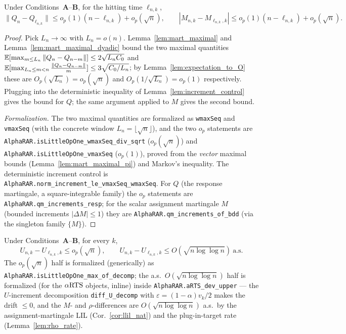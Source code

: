 \begin{lemma}\label{lem:QM_increments}
\leanok
{}
Under Conditions~\textbf{A}--\textbf{B}, for the hitting time $\ell_{n,k}$,
\[
  \|Q_n - Q_{\ell_{n,k}}\| \le o_p(1)(n-\ell_{n,k}) + o_p(\sqrt n),
  \qquad
  |M_{n,k} - M_{\ell_{n,k},k}| \le o_p(1)(n-\ell_{n,k}) + o_p(\sqrt n).
\]
\end{lemma}

\begin{proof}\leanok
{}
Pick $L_n\to\infty$ with $L_n = o(n)$. Lemma~\ref{lem:mart_maximal} and
Lemma~\ref{lem:mart_maximal_dyadic} bound the two maximal quantities
$\mathbb{E}[\max_{m\le L_n}\|Q_n-Q_{n-m}\|]\le 2\sqrt{L_n C_0}$ and
$\mathbb{E}[\max_{L_n\le m<n}\frac{\|Q_n-Q_{n-m}\|}{m}]\le 3\sqrt{C_0/L_n}$; by
Lemma~\ref{lem:expectation_to_O} these are $O_p(\sqrt{L_n})=o_p(\sqrt n)$ and
$O_p(1/\sqrt{L_n})=o_p(1)$ respectively. Plugging into the deterministic
inequality of Lemma~\ref{lem:increment_control} gives the bound for $Q$; the same
argument applied to $M$ gives the second bound.

\emph{Formalization.} The two maximal quantities are formalized as \texttt{wmaxSeq} and
\texttt{vmaxSeq} (with the concrete window $L_n=\lfloor\sqrt n\rfloor$), and the two $o_p$ statements
are \texttt{AlphaRAR.isLittleOpOne\_wmaxSeq\_div\_sqrt} ($o_p(\sqrt n)$) and
\texttt{AlphaRAR.isLittleOpOne\_vmaxSeq} ($o_p(1)$), proved from the \emph{vector} maximal bounds
(Lemma~\ref{lem:mart_maximal_pi}) and Markov's inequality. The deterministic increment control is
\texttt{AlphaRAR.norm\_increment\_le\_vmaxSeq\_wmaxSeq}. For $Q$ (the response martingale, a
square-integrable family) the $o_p$ statements are \texttt{AlphaRAR.qm\_increments\_resp}; for the
scalar assignment martingale $M$ (bounded increments $|\Delta M|\le1$) they are
\texttt{AlphaRAR.qm\_increments\_of\_bdd} (via the singleton family $\{M\}$).
\end{proof}

\begin{lemma}\label{lem:U_increment_bound}
Under Conditions~\textbf{A}--\textbf{B}, for every $k$,
\[
  U_{n,k} - U_{\ell_{n,k},k} \le o_p(\sqrt n),
  \qquad
  U_{n,k} - U_{\ell_{n,k},k} \le O(\sqrt{n\log\log n})\ \text{a.s.}
\]
The $o_p(\sqrt n)$ half is formalized (generically) as \texttt{AlphaRAR.isLittleOpOne\_max\_of\_decomp};
the a.s.\ $O(\sqrt{n\log\log n})$ half is formalized (for the $\alpha\text{RTS}$ objects, inline) inside
\texttt{AlphaRAR.aRTS\_dev\_upper} --- the $U$-increment decomposition \texttt{diff\_U\_decomp} with
$\varepsilon=(1-\alpha)v_k/2$ makes the drift $\le0$, and the $M$- and $\rho$-differences are
$O(\sqrt{n\log\log n})$ a.s.\ by the assignment-martingale LIL (Cor.~\ref{cor:llil_nat}) and the
plug-in-target rate (Lemma~\ref{lem:rho_rate}).
\end{lemma}

